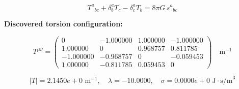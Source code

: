 
\begin{equation}
  T^a{}_{bc} + \delta^a_b T_c - \delta^a_c T_b = 8\pi G \, s^a{}_{bc}
\end{equation}

\textbf{Discovered torsion configuration:}

\begin{equation}
  T^{\mu\nu} = \begin{pmatrix}
    0 & -1.000000 & 1.000000 & -1.000000 \\
    1.000000 & 0 & 0.968757 & 0.811785 \\
    -1.000000 & -0.968757 & 0 & -0.059453 \\
    1.000000 & -0.811785 & 0.059453 & 0
  \end{pmatrix} \quad \text{m}^{-1}
\end{equation}

\begin{equation}
  |T| = 2.1450e+0 \text{ m}^{-1}, \quad
  \lambda = -10.0000, \quad
  \sigma = 0.0000e+0 \text{ J}\cdot\text{s/m}^3
\end{equation}